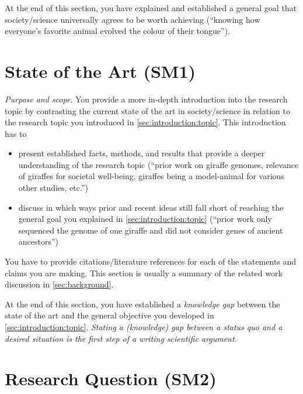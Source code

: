 \documentclass[
  numbers=noenddot,
  english,  %
  a4paper,  %
  twoside,  %
  bibliography=totoc,
  headsepline,
  cleardoublepage=empty,
  parskip=half,
  draft=false
]{scrbook}
\theoremstyle{break}
\begin{document}
At the end of this section, you have explained and established a general goal that society/science universally agrees to be worth achieving (``knowing how everyone's favorite animal evolved the colour of their tongue'').

\section{State of the Art (SM1)}\label{sec:introduction:state-of-art}

\emph{Purpose and scope}.
You provide a more in-depth introduction into the research topic by contrasting the current state of the art in society/science in relation to the research topic you introduced in \cref{sec:introduction:topic}.
This introduction has to

\begin{itemize}
  \item present established facts, methods, and results that provide a deeper understanding of the research topic (``prior work on giraffe genomes, relevance of giraffes for societal well-being, giraffes being a model-animal for various other studies, etc.'')
  \item discuss in which ways prior and recent ideas still fall short of reaching the general goal you explained in \cref{sec:introduction:topic} (``prior work only sequenced the genome of one giraffe and did not consider genes of ancient ancestors'')
\end{itemize}

You have to provide citations/literature references for each of the statements and claims you are making.
This section is usually a summary of the related work discussion in \cref{sec:background}.

At the end of this section, you have established a \emph{knowledge gap} between the state of the art and the general objective you developed in \cref{sec:introduction:topic}.
\emph{Stating a (knowledge) gap between a status quo and a desired situation is the \emph{first step} of a writing scientific argument.}

\section{Research Question (SM2)}\label{sec:introduction:research-question}
\end{document}
